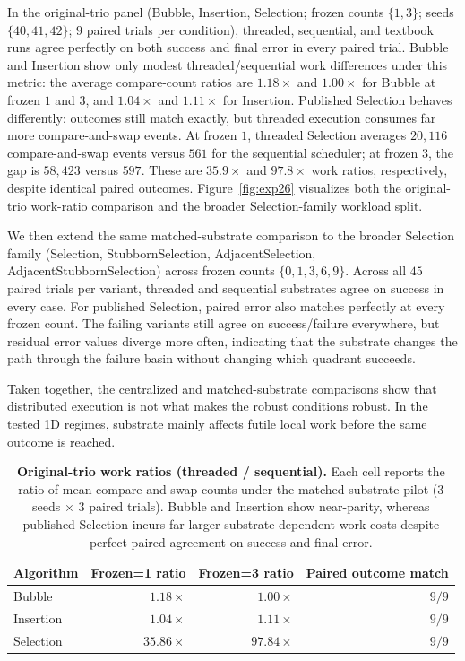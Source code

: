 \documentclass[11pt]{article}
\begin{document}
In the original-trio panel (Bubble, Insertion, Selection; frozen counts $\{1,3\}$; seeds
$\{40,41,42\}$; $9$ paired trials per condition), threaded, sequential, and textbook runs agree
perfectly on both success and final error in every paired trial. Bubble and Insertion show only
modest threaded/sequential work differences under this metric: the average compare-count ratios are
$1.18\times$ and $1.00\times$ for Bubble at frozen $1$ and $3$, and $1.04\times$ and
$1.11\times$ for Insertion. Published Selection behaves differently: outcomes still match exactly,
but threaded execution consumes far more compare-and-swap events. At frozen $1$, threaded Selection
averages $20{,}116$ compare-and-swap events versus $561$ for the sequential scheduler; at frozen
$3$, the gap is $58{,}423$ versus $597$. These are $35.9\times$ and $97.8\times$ work ratios,
respectively, despite identical paired outcomes. Figure~\ref{fig:exp26} visualizes both the
original-trio work-ratio comparison and the broader Selection-family workload split.

We then extend the same matched-substrate comparison to the broader Selection family
(Selection, StubbornSelection, AdjacentSelection, AdjacentStubbornSelection) across frozen counts
$\{0,1,3,6,9\}$. Across all $45$ paired trials per variant, threaded and sequential substrates
agree on success in every case. For published Selection, paired error also matches perfectly at
every frozen count. The failing variants still agree on success/failure everywhere, but residual
error values diverge more often, indicating that the substrate changes the path through the failure
basin without changing which quadrant succeeds.

Taken together, the centralized and matched-substrate comparisons show that distributed execution is
not what makes the robust conditions robust. In the tested 1D regimes, substrate mainly affects
futile local work before the same outcome is reached.

\begin{table}[t]
  \centering
  \small
  \begin{tabular}{@{}lrrr@{}}
    \toprule
    Algorithm & Frozen=1 ratio & Frozen=3 ratio & Paired outcome match \\
    \midrule
    Bubble & $1.18\times$ & $1.00\times$ & $9/9$ \\
    Insertion & $1.04\times$ & $1.11\times$ & $9/9$ \\
    Selection & $35.86\times$ & $97.84\times$ & $9/9$ \\
    \bottomrule
  \end{tabular}
  \caption{\textbf{Original-trio work ratios (threaded / sequential).}
  Each cell reports the ratio of mean compare-and-swap counts under the matched-substrate pilot
  (3 seeds $\times$ 3 paired trials). Bubble and Insertion show near-parity, whereas published
  Selection incurs far larger substrate-dependent work costs despite perfect paired agreement on
  success and final error.}
  \label{tab:exp26}
\end{table}
\end{document}
